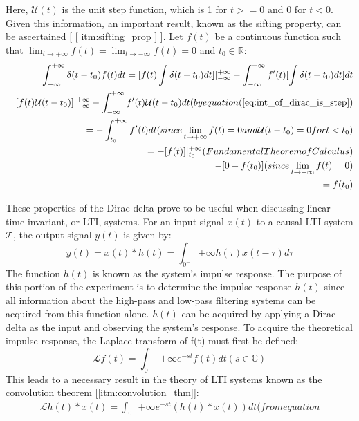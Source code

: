 Here, $\mathcal{U}(t)$ is the unit step function, which is 1 for $t >= 0$ and 0 for $t < 0$. Given this information, an important result, known as the sifting property, can be ascertained [ \ref{ itm:sifting_prop } ]. Let $f(t)$ be a continuous function such that $\lim_{ t \to +\infty } f(t) = \lim_{ t \to -\infty } f(t) = 0$ and $t_0 \in \mathbb{R}$:
\begin{equation*}
	\label{eq:sifting_prop}
	\begin{aligned}
	\int_{-\infty}^{+\infty} \delta( t - t_0 ) f(t) dt = [ f(t)\int \delta( t - t_0 ) dt ]\rvert_{-\infty}^{+\infty} - \int_{-\infty}^{+\infty} f'(t)[ \int \delta( t - t_0 ) dt ]dt \\
							   = [ f(t)\mathcal{U}( t - t_0 ) ]\rvert_{-\infty}^{+\infty} - \int_{-\infty}^{+\infty} f'(t)\mathcal{U}( t - t_0 )dt ( by equation (\ref{eq:int_of_dirac_is_step}) \\
							   = -\int_{t_0}^{+\infty} f'(t)dt ( since \lim_{ t \to +\infty } f(t) = 0 and \mathcal{U}( t - t_0 ) = 0 for t < t_0 ) \\
							   = -[ f(t) ]\rvert_{t_0}^{+\infty} ( Fundamental Theorem of Calculus ) \\
							   = -[ 0 - f(t_0) ] ( since \lim_{ t \to +\infty } f(t) = 0 ) \\
							   = f(t_0) \\
	\end{aligned}
\end{equation*}

These properties of the Dirac delta prove to be useful when discussing linear time-invariant, or LTI, systems. For an input signal $x(t)$ to a causal LTI system $\mathcal{T}$, the output signal $y(t)$ is given by:
\begin{equation}
	\label{eq:causal_lti_conv}
	y(t) = x(t) * h(t) = \int_{0^{-}}{+\infty} h(\tau)x(t-\tau)d\tau
\end{equation}
The function $h(t)$ is known as the system's impulse response. The purpose of this portion of the experiment is to determine the impulse response $h(t)$ since all information about the high-pass and low-pass filtering systems can be acquired from this function alone. $h(t)$ can be acquired by applying a Dirac delta as the input and observing the system's response.
To acquire the theoretical impulse response, the Laplace transform of f(t) must first be defined:
\begin{equation}
	\label{eq:lt_def}
	\mathcal{L}{f(t)} = \int_{0^{-}}{+\infty} e^{-st}f(t)dt ( s \in \mathbb{C} )
\end{equation}
This leads to a necessary result in the theory of LTI systems known as the convolution theorem [\ref{itm:convolution_thm}]:
\begin{equation*}
	\label{eq:conv_thm}
	\begin{aligned}
	\mathcal{L}{h(t) * x(t)} = \int_{0^{-}}{+\infty} e^{-st}( h(t) * x(t) )dt ( from equation
	\end{aligned}
\end{equation*}

